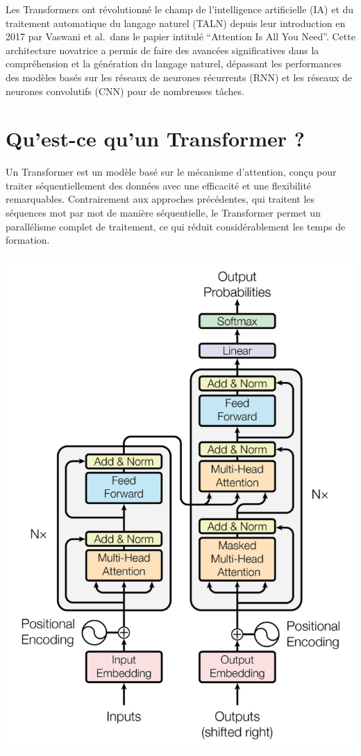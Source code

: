 \documentclass[
  letterpaper,
  DIV=11,
  numbers=noendperiod]{scrreprt}
\begin{document}
Les Transformers ont révolutionné le champ de l'intelligence
artificielle (IA) et du traitement automatique du langage naturel (TALN)
depuis leur introduction en 2017 par Vaswani et al.~dans le papier
intitulé ``Attention Is All You Need''. Cette architecture novatrice a
permis de faire des avancées significatives dans la compréhension et la
génération du langage naturel, dépassant les performances des modèles
basés sur les réseaux de neurones récurrents (RNN) et les réseaux de
neurones convolutifs (CNN) pour de nombreuses tâches.

\section{Qu'est-ce qu'un Transformer ?}\label{quest-ce-quun-transformer}

Un Transformer est un modèle basé sur le mécanisme d'attention, conçu
pour traiter séquentiellement des données avec une efficacité et une
flexibilité remarquables. Contrairement aux approches précédentes, qui
traitent les séquences mot par mot de manière séquentielle, le
Transformer permet un parallélisme complet de traitement, ce qui réduit
considérablement les temps de formation.

\includegraphics{images/attention_research_1-768x1082.png}
\end{document}
